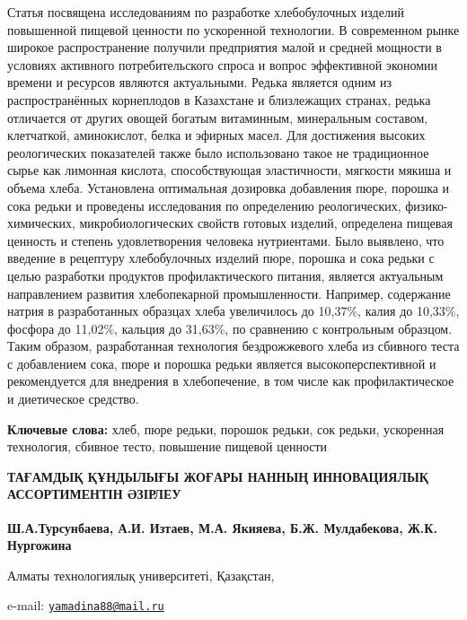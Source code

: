 Статья посвящена исследованиям по разработке хлебобулочных изделий
повышенной пищевой ценности по ускоренной технологии. В современном
рынке широкое распространение получили предприятия малой и средней
мощности в условиях активного потребительского спроса и вопрос
эффективной экономии времени и ресурсов являются актуальными. Редька
является одним из распространённых корнеплодов в Казахстане и
близлежащих странах, редька отличается от других овощей богатым
витаминным, минеральным составом, клетчаткой, аминокислот, белка и
эфирных масел. Для достижения высоких реологических показателей также
было использовано такое не традиционное сырье как лимонная кислота,
способствующая эластичности, мягкости мякиша и объема хлеба. Установлена
оптимальная дозировка добавления пюре, порошка и сока редьки и проведены
исследования по определению реологических, физико-химических,
микробиологических свойств готовых изделий, определена пищевая ценность
и степень удовлетворения человека нутриентами. Было выявлено, что
введение в рецептуру хлебобулочных изделий пюре, порошка и сока редьки с
целью разработки продуктов профилактического питания, является
актуальным направлением развития хлебопекарной промышленности. Например,
содержание натрия в разработанных образцах хлеба увеличилось до 10,37\%,
калия до 10,33\%, фосфора до 11,02\%, кальция до 31,63\%, по сравнению с
контрольным образцом. Таким образом, разработанная технология
бездрожжевого хлеба из сбивного теста с добавлением сока, пюре и порошка
редьки является высокоперспективной и рекомендуется для внедрения в
хлебопечение, в том числе как профилактическое и диетическое средство.

{\bfseries Ключевые слова:} хлеб, пюре редьки, порошок редьки, сок редьки,
ускоренная технология, сбивное тесто, повышение пищевой ценности

{\bfseries ТАҒАМДЫҚ ҚҰНДЫЛЫҒЫ ЖОҒАРЫ НАННЫҢ ИННОВАЦИЯЛЫҚ АССОРТИМЕНТІН
ӘЗІРЛЕУ}

{\bfseries Ш.А.Турсунбаева, А.И. Изтаев, М.А. Якияева\textsuperscript{\envelope },
Б.Ж. Мулдабекова, Ж.К. Нургожина}

Алматы технологиялық университеті, Қазақстан,

e-mail: \href{mailto:yamadina88@mail.ru}{\nolinkurl{yamadina88@mail.ru}}

